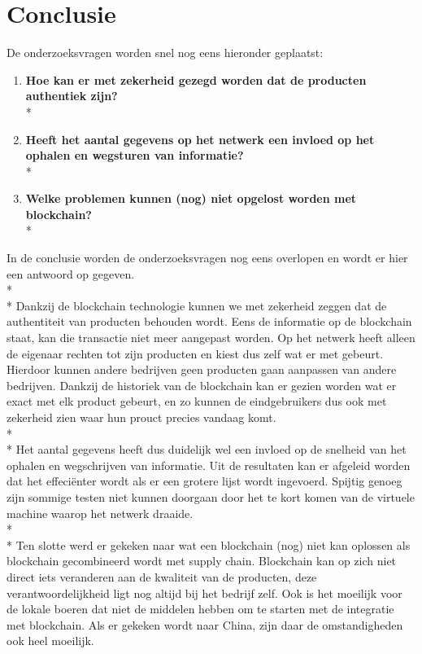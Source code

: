 
\chapter{Conclusie}
\label{ch:conclusie}

De onderzoeksvragen worden snel nog eens hieronder geplaatst:
\begin{enumerate}
	\item \textbf{Hoe kan er met zekerheid gezegd worden dat de producten authentiek zijn?}\\*
	\item \textbf{Heeft het aantal gegevens op het netwerk een invloed op het ophalen en wegsturen van informatie?}\\*
	\item \textbf{Welke problemen kunnen (nog) niet opgelost worden met blockchain?}\\*
\end{enumerate}

In de conclusie worden de onderzoeksvragen nog eens overlopen en wordt er hier een antwoord op gegeven.\\*\\*
Dankzij de blockchain technologie kunnen we met zekerheid zeggen dat de authentiteit van producten behouden wordt. Eens de informatie op de blockchain staat, kan die transactie niet meer aangepast worden. Op het netwerk heeft alleen de eigenaar rechten tot zijn producten en kiest dus zelf wat er met gebeurt. Hierdoor kunnen andere bedrijven geen producten gaan aanpassen van andere bedrijven. Dankzij de historiek van de blockchain kan er gezien worden wat er exact met elk product gebeurt, en zo kunnen de eindgebruikers dus ook met zekerheid zien waar hun prouct precies vandaag komt.\\*\\*
Het aantal gegevens heeft dus duidelijk wel een invloed op de snelheid van het ophalen en wegschrijven van informatie. Uit de resultaten kan er afgeleid worden dat het effeciënter wordt als er een grotere lijst wordt ingevoerd. Spijtig genoeg zijn sommige testen niet kunnen doorgaan door het te kort komen van de virtuele machine waarop het netwerk draaide.\\*\\*
Ten slotte werd er gekeken naar wat een blockchain (nog) niet kan oplossen als blockchain gecombineerd wordt met supply chain. Blockchain kan op zich niet direct iets veranderen aan de kwaliteit van de producten, deze verantwoordelijkheid ligt nog altijd bij het bedrijf zelf. Ook is het moeilijk voor de lokale boeren dat niet de middelen hebben om te starten met de integratie met blockchain. Als er gekeken wordt naar China, zijn daar de omstandigheden ook heel moeilijk. 
